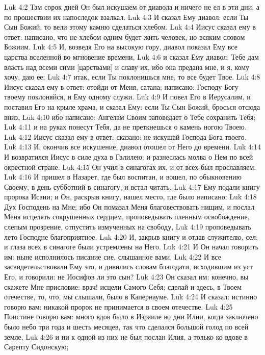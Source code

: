 Luk 4:2  Там сорок дней Он был искушаем от диавола и ничего не ел в эти дни, а по прошествии их напоследок взалкал.
Luk 4:3  И сказал Ему диавол: если Ты Сын Божий, то вели этому камню сделаться хлебом.
Luk 4:4  Иисус сказал ему в ответ: написано, что не хлебом одним будет жить человек, но всяким словом Божиим.
Luk 4:5  И, возведя Его на высокую гору, диавол показал Ему все царства вселенной во мгновение времени,
Luk 4:6  и сказал Ему диавол: Тебе дам власть над всеми сими [царствами] и славу их, ибо она предана мне, и я, кому хочу, даю ее;
Luk 4:7  итак, если Ты поклонишься мне, то все будет Твое.
Luk 4:8  Иисус сказал ему в ответ: отойди от Меня, сатана; написано: Господу Богу твоему поклоняйся, и Ему одному служи.
Luk 4:9  И повел Его в Иерусалим, и поставил Его на крыле храма, и сказал Ему: если Ты Сын Божий, бросься отсюда вниз,
Luk 4:10  ибо написано: Ангелам Своим заповедает о Тебе сохранить Тебя;
Luk 4:11  и на руках понесут Тебя, да не преткнешься о камень ногою Твоею.
Luk 4:12  Иисус сказал ему в ответ: сказано: не искушай Господа Бога твоего.
Luk 4:13  И, окончив все искушение, диавол отошел от Него до времени.
Luk 4:14  И возвратился Иисус в силе духа в Галилею; и разнеслась молва о Нем по всей окрестной стране.
Luk 4:15  Он учил в синагогах их, и от всех был прославляем.
Luk 4:16  И пришел в Назарет, где был воспитан, и вошел, по обыкновению Своему, в день субботний в синагогу, и встал читать.
Luk 4:17  Ему подали книгу пророка Исаии; и Он, раскрыв книгу, нашел место, где было написано:
Luk 4:18  Дух Господень на Мне; ибо Он помазал Меня благовествовать нищим, и послал Меня исцелять сокрушенных сердцем, проповедывать пленным освобождение, слепым прозрение, отпустить измученных на свободу,
Luk 4:19  проповедывать лето Господне благоприятное.
Luk 4:20  И, закрыв книгу и отдав служителю, сел; и глаза всех в синагоге были устремлены на Него.
Luk 4:21  И Он начал говорить им: ныне исполнилось писание сие, слышанное вами.
Luk 4:22  И все засвидетельствовали Ему это, и дивились словам благодати, исходившим из уст Его, и говорили: не Иосифов ли это сын?
Luk 4:23  Он сказал им: конечно, вы скажете Мне присловие: врач! исцели Самого Себя; сделай и здесь, в Твоем отечестве, то, что, мы слышали, было в Капернауме.
Luk 4:24  И сказал: истинно говорю вам: никакой пророк не принимается в своем отечестве.
Luk 4:25  Поистине говорю вам: много вдов было в Израиле во дни Илии, когда заключено было небо три года и шесть месяцев, так что сделался большой голод по всей земле,
Luk 4:26  и ни к одной из них не был послан Илия, а только ко вдове в Сарепту Сидонскую;
